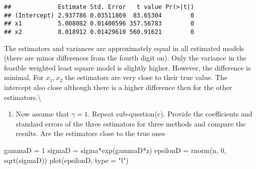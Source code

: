 \documentclass[
]{article}
\newenvironment{Shaded}{\begin{snugshade}}{\end{snugshade}}
\newcommand{\AttributeTok}[1]{\textcolor[rgb]{0.77,0.63,0.00}{#1}}
\newcommand{\CommentTok}[1]{\textcolor[rgb]{0.56,0.35,0.01}{\textit{#1}}}
\newcommand{\DecValTok}[1]{\textcolor[rgb]{0.00,0.00,0.81}{#1}}
\newcommand{\FunctionTok}[1]{\textcolor[rgb]{0.00,0.00,0.00}{#1}}
\newcommand{\NormalTok}[1]{#1}
\newcommand{\OtherTok}[1]{\textcolor[rgb]{0.56,0.35,0.01}{#1}}
\newcommand{\SpecialCharTok}[1]{\textcolor[rgb]{0.00,0.00,0.00}{#1}}
\newcommand{\StringTok}[1]{\textcolor[rgb]{0.31,0.60,0.02}{#1}}
\providecommand{\tightlist}{%
  \setlength{\itemsep}{0pt}\setlength{\parskip}{0pt}}
\begin{document}
\begin{Shaded}
\end{Shaded}

\begin{verbatim}
##             Estimate Std. Error   t value Pr(>|t|)
## (Intercept) 2.937786 0.03511869  83.65304        0
## x1          5.008082 0.01400596 357.56783        0
## x2          8.018912 0.01429610 560.91621        0
\end{verbatim}

The estimators and variances are approximately equal in all estimated
models (there are minor differences from the fourth digit on). Only the
variance in the feasible weighted least square model is slightly higher.
However, the difference is minimal. For \(x_1, x_2\) the estimators are
very close to their true value. The intercept also close although there
is a higher difference then for the other estimators.\textbackslash{}

\begin{enumerate}
\def\labelenumi{\alph{enumi})}
\setcounter{enumi}{3}
\tightlist
\item
  Now assume that \(\gamma = 1\). Repeat sub-question(c). Provide the
  coefficients and standard errors of the three estimators for three
  methods and compare the results. Are the estimators close to the true
  ones
\end{enumerate}

\begin{Shaded}
\begin{Highlighting}[]
\NormalTok{gammaD }\OtherTok{=} \DecValTok{1}
\NormalTok{sigmaD }\OtherTok{=}\NormalTok{ sigma}\SpecialCharTok{*}\FunctionTok{exp}\NormalTok{(gammaD}\SpecialCharTok{*}\NormalTok{z)}
\NormalTok{epsilonD }\OtherTok{=} \FunctionTok{rnorm}\NormalTok{(n, }\DecValTok{0}\NormalTok{, }\FunctionTok{sqrt}\NormalTok{(sigmaD))}
\FunctionTok{plot}\NormalTok{(epsilonD, }\AttributeTok{type =} \StringTok{"l"}\NormalTok{)}
\end{Highlighting}
\end{Shaded}
\end{document}
